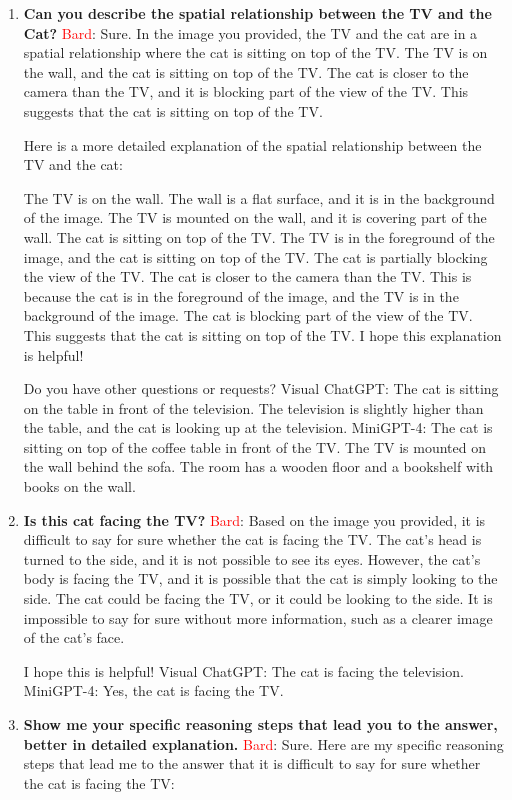\begin{enumerate}
    \item \textbf{Can you describe the spatial relationship between the TV and the Cat?}
    \subitem \textcolor{Red}{Bard}: 
    Sure. In the image you provided, the TV and the cat are in a spatial relationship where the cat is sitting on top of the TV. The TV is on the wall, and the cat is sitting on top of the TV. The cat is closer to the camera than the TV, and it is blocking part of the view of the TV. This suggests that the cat is sitting on top of the TV.

    Here is a more detailed explanation of the spatial relationship between the TV and the cat:

    The TV is on the wall. The wall is a flat surface, and it is in the background of the image. The TV is mounted on the wall, and it is covering part of the wall.
    The cat is sitting on top of the TV. The TV is in the foreground of the image, and the cat is sitting on top of the TV. The cat is partially blocking the view of the TV.
    The cat is closer to the camera than the TV. This is because the cat is in the foreground of the image, and the TV is in the background of the image.
    The cat is blocking part of the view of the TV. This suggests that the cat is sitting on top of the TV.
    I hope this explanation is helpful!

    Do you have other questions or requests?
    \subitem Visual ChatGPT: The cat is sitting on the table in front of the television. The television is slightly higher than the table, and the cat is looking up at the television.
    \subitem MiniGPT-4: The cat is sitting on top of the coffee table in front of the TV. The TV is mounted on the wall behind the sofa. The room has a wooden floor and a bookshelf with books on the wall.
    \item \textbf{Is this cat facing the TV?}
    \subitem \textcolor{Red}{Bard}: Based on the image you provided, it is difficult to say for sure whether the cat is facing the TV. The cat's head is turned to the side, and it is not possible to see its eyes. However, the cat's body is facing the TV, and it is possible that the cat is simply looking to the side. The cat could be facing the TV, or it could be looking to the side. It is impossible to say for sure without more information, such as a clearer image of the cat's face.

    I hope this is helpful!
    \subitem Visual ChatGPT: The cat is facing the television.
    \subitem MiniGPT-4: Yes, the cat is facing the TV.
    \item \textbf{Show me your specific reasoning steps that lead you to the answer, better in detailed explanation.}
    \subitem \textcolor{Red}{Bard}: Sure. Here are my specific reasoning steps that lead me to the answer that it is difficult to say for sure whether the cat is facing the TV:


\end{enumerate}
